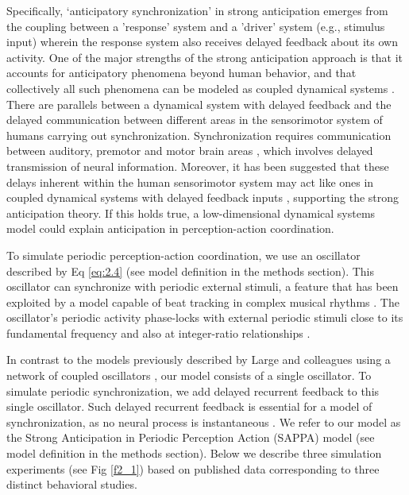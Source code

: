 \documentclass{report}
\begin{document}
Specifically, ‘anticipatory synchronization’ in strong anticipation emerges from the coupling between a 'response' system and a 'driver' system (e.g., stimulus input) wherein the response system also receives delayed feedback about its own activity. One of the major strengths of the strong anticipation approach is that it accounts for anticipatory phenomena beyond human behavior, and that collectively all such phenomena can be modeled as coupled dynamical systems \cite{stepp2010strong, washburn2015harmony, kelso1995dynamic}. There are parallels between a dynamical system with delayed feedback and the delayed communication between different areas in the sensorimotor system of humans carrying out synchronization. Synchronization requires communication between auditory, premotor and motor brain areas \cite{merchant2015finding, banerjee2007neural, slowinski2016effects}, which involves delayed transmission of neural information. Moreover, it has been suggested that these delays inherent within the human sensorimotor system may act like ones in coupled dynamical systems with delayed feedback inputs \cite{washburn2015harmony, banerjee2007neural, slowinski2016effects}, supporting the strong anticipation theory. If this holds true, a low-dimensional dynamical systems model could explain anticipation in perception-action coordination.

To simulate periodic perception-action coordination, we use an oscillator described by Eq \eqref{eq:2.4} (see model definition in the methods section). This oscillator can synchronize with periodic external stimuli, a feature that has been exploited by a model capable of beat tracking in complex musical rhythms \cite{large2015neural, velasco2011pulse}. The oscillator’s periodic activity phase-locks with external periodic stimuli close to its fundamental frequency and also at integer-ratio relationships \cite{large2010canonical}.

In contrast to the models previously described by Large and colleagues using a network of coupled oscillators \cite{large2015neural, velasco2011pulse, large2010canonical}, our model consists of a single oscillator. To simulate periodic synchronization, we add delayed recurrent feedback to this single oscillator. Such delayed recurrent feedback is essential for a model of synchronization, as no neural process is instantaneous \cite{banerjee2007neural}. We refer to our model as the Strong Anticipation in Periodic Perception Action (SAPPA) model (see model definition in the methods section). Below we describe three simulation experiments (see Fig \ref{f2_1}) based on published data corresponding to three distinct behavioral studies.
\end{document}
